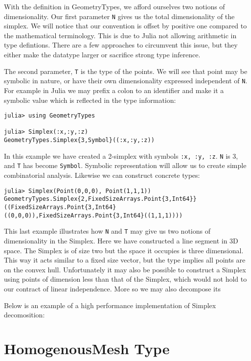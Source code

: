 With the definition in GeometryTypes, we afford ourselves two notions of
dimensionality. Our first parameter \texttt{N} gives us the total dimensionality
of the simplex. We will notice that our convention is offset by positive one
compared to the mathematical terminology. This is due to Julia not allowing
arithmetic in type defintions. There are a few approaches to circumvent this
issue, but they either make the datatype larger or sacrifice strong
type inference.

The second parameter, \texttt{T} is the type of the points. We will see that
point may be symbolic in nature, or have their own dimensionality
expressed independent of \texttt{N}.
For example in Julia we
may
prefix a colon to an identifier and make it a symbolic value which is reflected
in the type information:

\begin{lstlisting}
julia> using GeometryTypes

julia> Simplex(:x,:y,:z)
GeometryTypes.Simplex{3,Symbol}((:x,:y,:z))
\end{lstlisting}

In this example we have created a 2-simplex with symbols \texttt{:x, :y, :z}.
\texttt{N} is 3, and \texttt{T} has become \texttt{Symbol}.
Symbolic representation will allow us to create simple combinatorial
analysis.
Likewise we can construct concrete types:

\begin{lstlisting}
julia> Simplex(Point(0,0,0), Point(1,1,1))
GeometryTypes.Simplex{2,FixedSizeArrays.Point{3,Int64}}((FixedSizeArrays.Point{3,Int64}((0,0,0)),FixedSizeArrays.Point{3,Int64}((1,1,1))))
\end{lstlisting}

This last example illustrates how \texttt{N} and \texttt{T} may give us
two notions of dimensionality in the Simplex.
Here we have constructed a line segment in 3D space. The Simplex is of
size two but the space it occupies is three dimensional. This way it acts
similar to a fixed size vector, but the type implies all points are on the
convex hull. Unfortunately it may also be possible to construct a Simplex
using points of dimension less than that of the Simplex, which would
not hold to our contract of linear independence.
More so we may also decompose its

Below is an example of a high performance implementation of Simplex decomosition:



\section{HomogenousMesh Type}

